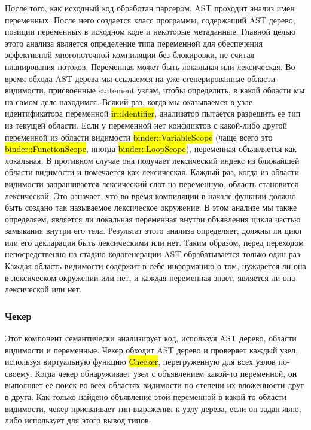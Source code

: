 После того, как исходный код обработан парсером, AST проходит анализ имен переменных.
После него создается класс программы, содержащий AST дерево, позиции переменных в исходном коде и некоторые метаданные.
Главной целью этого анализа является определение типа переменной для обеспечения эффективной многопоточной компиляции
без блокировки, не считая планирования потоков.
Переменная может быть локальная или лексическая.
Во время обхода AST дерева мы ссылаемся на уже сгенерированные области видимости, присвоенные statement узлам,
чтобы определить, в какой области мы на самом деле находимся.
Всякий раз, когда мы оказываемся в узле идентификатора переменной \hl{ir::Identifier},
анализатор пытается разрешить ее тип из текущей области.
Если у переменной нет конфликтов с какой-либо другой переменной из области видимости \hl{binder::VariableScope}
(чаще всего это \hl{binder::FunctionScope}, иногда \hl{binder::LoopScope}), переменная объявляется как локальная.
В противном случае она получает лексический индекс из ближайшей области видимости и помечается как лексическая.
Каждый раз, когда из области видимости запрашивается лексический слот на переменную, область становится лексической.
Это означает, что во время компиляции в начале функции должно быть создано так называемое лексическое окружение.
В этом анализе мы также определяем, является ли локальная переменная внутри объявления цикла частью замыкания
внутри его тела.
Результат этого анализа определяет, должны ли цикл или его декларация быть лексическими или нет.
Таким образом, перед переходом непосредственно на стадию кодогенерации AST обрабатывается только один раз.
Каждая область видимости содержит в себе информацию о том, нуждается ли она в лексическом окружении или нет,
и каждая переменная знает, является ли она лексической или нет.

\subsubsection{Чекер}

Этот компонент семантически анализирует код, используя AST дерево, области видимости и переменные.
Чекер обходит AST дерево и проверяет каждый узел, используя виртуальную функцию \hl{Checker},
перегруженную для всех узлов по-своему.
Когда чекер обнаруживает узел с объявлением какой-то переменной, он выполняет ее поиск во всех областях видимости
по степени их вложенности друг в друга.
Как только найдено объявление этой переменной в какой-то области видимости, чекер присваивает тип выражения к узлу
дерева, если он задан явно, либо использует для этого вывод типов.

